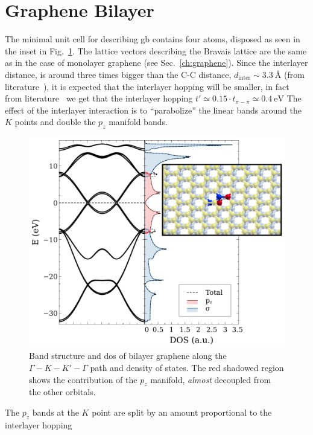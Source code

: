 \section{Graphene Bilayer}
The minimal unit cell for describing \ac{gb} contains four atoms, disposed as seen in the inset in Fig.~\ref{bilayer}. The lattice vectors describing the Bravais lattice are the same as in the case of monolayer graphene (see Sec.~\ref{ch:graphene}). Since the interlayer distance, is  around three times bigger than the C-C distance, $d_\text{inter} \sim \SI{3.3}{\angstrom}$ (from literature~\cite{Charlier1994a,Lam2008,Brihuega2012}), it is expected that the interlayer hopping will be smaller, in fact from literature~\cite{KatsnelsonBook} we get that the interlayer hopping $t'\simeq 0.15\cdot t_{\pi-\pi}\simeq\SI{0.4}{\eV}$
The effect of the interlayer interaction is to ``parabolize'' the linear bands around the $K$ points and double the $p_z$ manifold bands.
\begin{figure}[!ht]
\centering
\includegraphics{chapter06/figures/bilayer_bandDOS.pdf}
\vspace{-5pt}
\caption{Band structure and \ac{dos} of bilayer graphene along the $\Gamma-K-K'-\Gamma$ path and density of states. The red shadowed region shows the contribution of the $p_z$ manifold, \emph{almost} decoupled from the other orbitals.}
\label{bilayer}
\end{figure}
\FloatBarrier
The $p_z$ bands at the $K$ point are split by an amount proportional to the interlayer hopping

